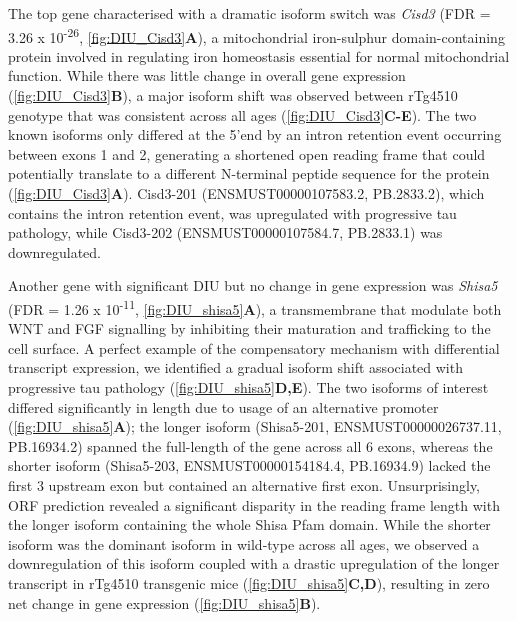 The top gene characterised with a dramatic isoform switch was \textit{Cisd3} (FDR = 3.26 x 10\textsuperscript{-26}, \cref{fig:DIU_Cisd3}\textbf{A}), a mitochondrial iron-sulphur domain-containing protein involved in regulating iron homeostasis essential for normal mitochondrial function\cite{Wiley2007}. While there was little change in overall gene expression (\cref{fig:DIU_Cisd3}\textbf{B}), a major isoform shift was observed between rTg4510 genotype that was consistent across all ages (\cref{fig:DIU_Cisd3}\textbf{C-E}). The two known isoforms only differed at the 5'end by an intron retention event occurring between exons 1 and 2, generating a shortened open reading frame that could potentially translate to a different N-terminal peptide sequence for the protein (\cref{fig:DIU_Cisd3}\textbf{A}). Cisd3-201 (ENSMUST00000107583.2, PB.2833.2), which contains the intron retention event, was upregulated with progressive tau pathology, while Cisd3-202 (ENSMUST00000107584.7, PB.2833.1) was downregulated.  

Another gene with significant DIU but no change in gene expression was \textit{Shisa5} (FDR = 1.26 x 10\textsuperscript{-11}, \cref{fig:DIU_shisa5}\textbf{A}), a transmembrane that modulate both WNT and FGF signalling by inhibiting their maturation and trafficking to the cell surface\cite{Yamamoto2005}. A perfect example of the compensatory mechanism with differential transcript expression, we identified a gradual isoform shift associated with progressive tau pathology (\cref{fig:DIU_shisa5}\textbf{D,E}). The two isoforms of interest differed significantly in length due to usage of an alternative promoter (\cref{fig:DIU_shisa5}\textbf{A}); the longer isoform (Shisa5-201, ENSMUST00000026737.11, PB.16934.2) spanned the full-length of the gene across all 6 exons, whereas the shorter isoform (Shisa5-203, ENSMUST00000154184.4, PB.16934.9) lacked the first 3 upstream exon but contained an alternative first exon. Unsurprisingly, ORF prediction revealed a significant disparity in the reading frame length with the longer isoform containing the whole Shisa Pfam domain. While the shorter isoform was the dominant isoform in wild-type across all ages, we observed a downregulation of this isoform coupled with a drastic upregulation of the longer transcript in rTg4510 transgenic mice (\cref{fig:DIU_shisa5}\textbf{C,D}), resulting in zero net change in gene expression (\cref{fig:DIU_shisa5}\textbf{B}). 


